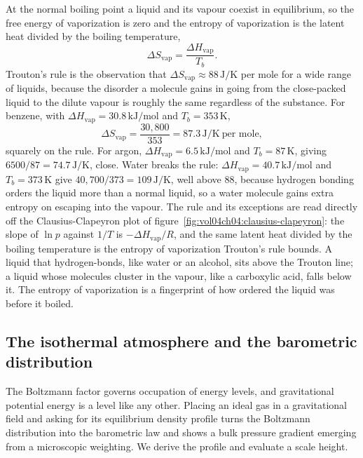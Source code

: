 At the normal boiling point a liquid and its vapour coexist in equilibrium, so
the free energy of vaporization is zero and the entropy of vaporization is the
latent heat divided by the boiling temperature,
\[
\Delta S_{\text{vap}} = \frac{\Delta H_{\text{vap}}}{T_b}.
\]
Trouton's rule is the observation that $\Delta S_{\text{vap}} \approx
88\,\si{\joule\per\kelvin}$ per mole for a wide range of liquids, because the
disorder a molecule gains in going from the close-packed liquid to the dilute
vapour is roughly the same regardless of the substance. For benzene, with
$\Delta H_{\text{vap}} = 30.8\,\text{kJ}/\text{mol}$ and $T_b = 353\,\si{\kelvin}$,
\[
\Delta S_{\text{vap}} = \frac{30{,}800}{353} = 87.3\,\si{\joule\per\kelvin}
\ \text{per mole},
\]
squarely on the rule. For argon, $\Delta H_{\text{vap}} = 6.5\,\text{kJ}/\text{mol}$
and $T_b = 87\,\si{\kelvin}$, giving $6500/87 = 74.7\,\si{\joule\per\kelvin}$,
close. Water breaks the rule: $\Delta H_{\text{vap}} = 40.7\,\text{kJ}/\text{mol}$
and $T_b = 373\,\si{\kelvin}$ give $40{,}700/373 = 109\,\si{\joule\per\kelvin}$,
well above $88$, because hydrogen bonding orders the liquid more than a normal
liquid, so a water molecule gains extra entropy on escaping into the vapour.
The rule and its exceptions are read directly off the Clausius-Clapeyron plot of
figure~\ref{fig:vol04ch04:clausius-clapeyron}: the slope of $\ln p$ against
$1/T$ is $-\Delta H_{\text{vap}}/R$, and the same latent heat divided by the
boiling temperature is the entropy of vaporization Trouton's rule bounds. A
liquid that hydrogen-bonds, like water or an alcohol, sits above the Trouton
line; a liquid whose molecules cluster in the vapour, like a carboxylic acid,
falls below it. The entropy of vaporization is a fingerprint of how ordered the
liquid was before it boiled.



\subsection{The isothermal atmosphere and the barometric distribution}

The Boltzmann factor governs occupation of energy levels, and gravitational
potential energy is a level like any other. Placing an ideal gas in a
gravitational field and asking for its equilibrium density profile turns the
Boltzmann distribution into the barometric law and shows a bulk pressure
gradient emerging from a microscopic weighting. We derive the profile and
evaluate a scale height.

